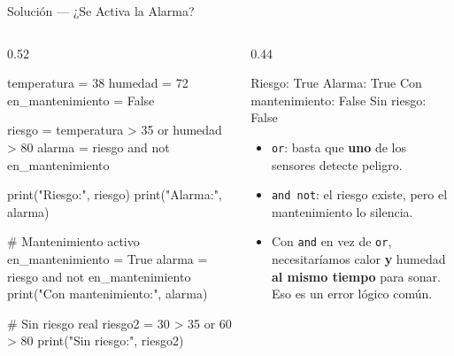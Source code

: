 \documentclass[aspectratio=169, 11pt]{beamer}
\begin{document}
\begin{frame}[fragile,shrink=30]{Solución --- ¿Se Activa la Alarma?}
  \vspace{-6pt}
  \begin{columns}[T]
    \begin{column}{0.52\textwidth}
      \begin{pyblock}
temperatura = 38
humedad     = 72
en_mantenimiento = False

riesgo = temperatura > 35 or humedad > 80
alarma = riesgo and not en_mantenimiento

print("Riesgo:", riesgo)
print("Alarma:", alarma)

# Mantenimiento activo
en_mantenimiento = True
alarma = riesgo and not en_mantenimiento
print("Con mantenimiento:", alarma)

# Sin riesgo real
riesgo2 = 30 > 35 or 60 > 80
print("Sin riesgo:", riesgo2)
      \end{pyblock}
    \end{column}

    \begin{column}{0.44\textwidth}
      \vspace{4pt}
      \begin{outputblock}
Riesgo: True
Alarma: True
Con mantenimiento: False
Sin riesgo: False
      \end{outputblock}

      \vspace{4pt}
      {\footnotesize\color{textMuted}
      \begin{itemize}\setlength{\itemsep}{4pt}
        \item[{\color{codeGreen}\scriptsize\faCheck}]
          \texttt{or}: basta que \textbf{uno}
          de los sensores detecte peligro.
        \item[{\color{codeGreen}\scriptsize\faCheck}]
          \texttt{and not}: el riesgo existe,
          pero el mantenimiento lo silencia.
        \item[{\color{arcaRed}\scriptsize\faLightbulb}]
          Con \texttt{and} en vez de \texttt{or},
          necesitaríamos calor \textbf{y} humedad
          \textbf{al mismo tiempo} para sonar.
          Eso es un error lógico común.
      \end{itemize}
      }
    \end{column}
  \end{columns}
\end{frame}
\end{document}

